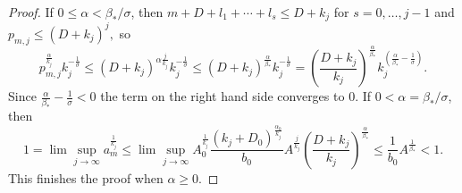 \documentclass[12pt]{amsart}
\begin{document}
\begin{proof}
	If $
	0\leq\alpha
	<
	\beta_{\ast}/\sigma$, then  $m+D+l_{1}+\cdots+l_{s}\leq D+k_{j}$ for
	$s=0, \dots ,j-1$ and $p_{m,j}\leq\left(  D+k_{j}\right)  ^{j},$ so
	\[
	p_{m,j}^{\frac{\alpha}{k_{j}}}k_{j}^{-\frac{1}{\sigma}}
	\leq
	\left(  D+k_{j}\right)
	^{\alpha\frac{j}{k_{j}}}k_{j}^{-\frac{1}{\sigma}}\leq\left(  D+k_{j}\right)
	^{\frac{\alpha}{\beta_{\ast}}}k_{j}^{-\frac{1}{\sigma}}=\left(  \frac{D+k_{j}
	}{k_{j}}\right)  ^{\frac{\alpha}{\beta_{\ast}}}k_{j}^{\left(  \frac{\alpha
		}{\beta_{\ast}}-\frac{1}{\sigma}\right)  }.
	\]
	Since $\frac{\alpha}{\beta_{\ast}}-\frac{1}{\sigma}<0$ the term on the right
	hand side converges to $0$. If  $
	0 <\alpha
	=
	\beta_{\ast}/\sigma$, then
	\[
	1=\lim\sup_{j\rightarrow\infty}a_{m}^{\frac{1}{k_{j}}}
	\leq
	\lim\sup
	_{j\rightarrow\infty}A_{0}^{\frac{1}{k_{j}}}\frac{\left(  k_{j}+D_{0}\right)
		^{\frac{\alpha_{0}}{k_{j}}}}{b_{0}}A^{\frac{j}{k_{j}}}\left(  \frac{D+k_{j}
	}{k_{j}}\right)  ^{\frac{\alpha}{\beta_{\ast}}}\leq\frac{1}{b_{0}}A^{\frac
		{1}{\beta_{\ast}}} < 1.
	\] 
	This finishes the proof when $\alpha\geq0.$
	

\end{proof}
\end{document}
